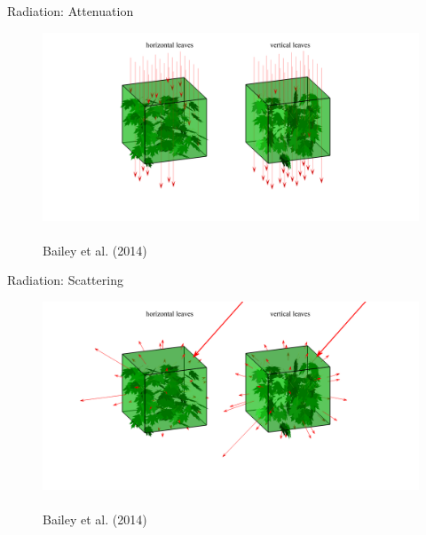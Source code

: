 
\begin{frame}{Radiation: Attenuation}
\begin{figure}
	\includegraphics[width=\textwidth]{fig15.png}
	\centering \tiny~\\Bailey et al. (2014)
\end{figure}
\end{frame}


\begin{frame}{Radiation: Scattering}
\begin{figure}
	\includegraphics[width=\textwidth]{fig16.png}
	\centering \tiny~\\Bailey et al. (2014)
\end{figure}
\end{frame}


